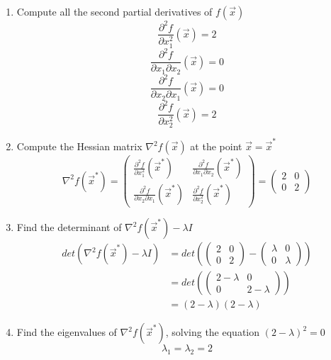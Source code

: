     \begin{enumerate}
        \item Compute all the second partial derivatives of \(f(\vec{x})\)
        \[\frac{\partial^2 f}{\partial x_1^2}(\vec{x}) = 2\]
        \[\frac{\partial^2 f}{\partial x_1 \partial x_2}(\vec{x}) = 0\]
        \[\frac{\partial^2 f}{\partial x_2 \partial x_1}(\vec{x}) = 0\]
        \[\frac{\partial^2 f}{\partial x_2^2}(\vec{x}) = 2\]
        \item Compute the Hessian matrix \(\nabla^2 f(\vec{x})\) at the point \(\vec{x} = \vec{x}^*\)
            \[
                \nabla^2 f(\vec{x}^*) =
                \begin{pmatrix}
                    \frac{\partial^2 f}{\partial x_1^2}(\vec{x}^*) &
                    \frac{\partial^2 f}{\partial x_1 \partial x_2}(\vec{x}^*) \\
                    \frac{\partial^2 f}{\partial x_2 \partial x_1}(\vec{x}^*) &
                    \frac{\partial^2 f}{\partial x_2^2}(\vec{x}^*)
                \end{pmatrix}
                =
                \begin{pmatrix}
                    2 & 0 \\
                    0 & 2
                \end{pmatrix}
            \]
        \item Find the determinant of \(\nabla^2 f(\vec{x}^*) - \lambda I\)
            \begin{align*}
                det(\nabla^2 f(\vec{x}^*) - \lambda I) &= det\left (
                \begin{pmatrix}
                    2 & 0 \\
                    0 & 2
                \end{pmatrix}
                -
                \begin{pmatrix}
                    \lambda & 0 \\
                    0 & \lambda
                \end{pmatrix}
                \right ) \\
                &= det \left (
                    \begin{pmatrix}
                        2-\lambda & 0 \\
                        0 & 2-\lambda
                    \end{pmatrix}
                \right ) \\
                &= (2-\lambda)(2-\lambda)
            \end{align*}
        \item Find the eigenvalues of \(\nabla^2 f(\vec{x}^*)\), solving the equation \((2-\lambda)^2 = 0\)
            \[\lambda_1 = \lambda_2 = 2\]
    \end{enumerate}
